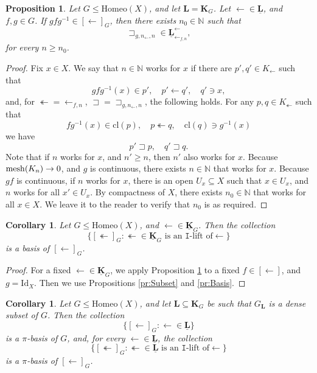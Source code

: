 \documentclass[12pt]{amsart}
\numberwithin{equation}{section}
\theoremstyle{plain}
\newtheorem{corollary}[theorem]{\bf Corollary}
\newtheorem{proposition}[theorem]{\bf Proposition}
\theoremstyle{definition}
\newcommand \Homeo{ \mbox{Homeo}}
\newcommand \Id{ \mbox{Id}}
\newcommand \mesh{{\rm{ mesh}}}
\newcommand \sqsp{\sqsupset}
\newcommand \la{\leftarrow}
\newcommand{\cl}{\mbox{cl}}
\newcommand \KKb{\mathbf{K}}
\newcommand \LLb{\mathbf{L}}
\newcommand \KKub{\underline{\mathbf{K}}}
\newcommand \LLub{\underline{\mathbf{L}}}
\newcommand \NN{\mathbb{N}}
\newcommand \It{\mathtt{I}}
\begin{document}
\begin{proposition}
	\label{pr:InMorphism}
	Let $G \leq \Homeo(X)$, and let $\LLb=\KKb_G$. Let $\la \in \LLub$, and $f,g \in G$. If $gfg^{-1} \in [\la]_G$, then there exists $n_0 \in \NN$ such that $$\sqsp_{g,n_\la, n} \in \LLub^\la_{\la_{f,n}},$$ for every $n \geq n_0$.
\end{proposition}

\begin{proof}
	Fix $x \in X$. We say that $n \in \NN$ works for $x$ if there are $p',q' \in K_\la$ such that $$gfg^{-1}(x) \in p', \quad  p' \la q', \quad q' \ni x,$$ and, for $\twoheadleftarrow=\la_{f,n}$, $\sqsp=\sqsp_{g,n_\la,n}$, the following holds. For any $p,q \in K_{\twoheadleftarrow}$ such that $$fg^{-1}(x) \in \cl(p),  \quad p \twoheadleftarrow q, \quad  \cl(q) \ni g^{-1}(x)$$ we have $$p' \sqsp p, \quad q' \sqsp q.$$ Note that if $n$ works for $x$, and $n' \geq n$, then $n'$ also works for $x$. Because $\mesh(K_n) \to 0$, and $g$ is continuous, there exists $n \in \NN$ that works for $x$. Because $gf$ is continuous, if $n$ works for $x$, there is an open $U_x \subseteq X$ such that $x \in U_x$, and $n$ works for all $x' \in U_x$. By compactness of $X$, there exists $n_0 \in \NN$ that works for all $x \in X$. We leave it to the reader to verify that $n_0$ is as required.
\end{proof}

\begin{corollary}
\label{co:LiftBasis}
Let $G \leq \Homeo(X)$, and $\la \in \KKub_G$. Then the collection $$\{[\twoheadleftarrow]_G: \twoheadleftarrow \in \KKub_G \mbox{ is an } \It \mbox{-lift of} \la \}$$ is a basis of $[\la]_G$.
\end{corollary}

\begin{proof}
For a fixed $\la \in \KKub_G$, we apply Proposition \ref{pr:InMorphism} to a fixed $f \in [\la]$, and $g=\Id_X$. Then we use Propositions \ref{pr:Subset} and \ref{pr:Basis}.
\end{proof}

\begin{corollary}
	\label{co:DensePiBasis}
	Let $G \leq \Homeo(X)$, and let $\LLb \subseteq \KKb_G$ be such that $G_\LLb$ is a dense subset of $G$. Then  the collection $$\{[\la]_G: \la \in \LLub\}$$ is a $\pi$-basis of $G$, and, for every $\la \in \LLub$, the collection $$\{[\twoheadleftarrow]_G: \twoheadleftarrow \in \LLub \mbox{ is an } \It \mbox{-lift of} \la \}$$ is a $\pi$-basis of $[\la]_G$.
\end{corollary}
\end{document}
